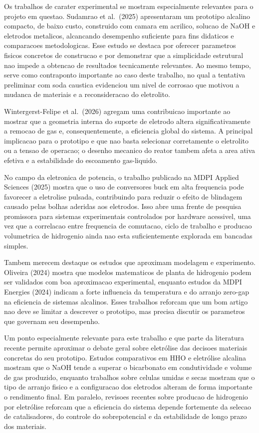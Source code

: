 \documentclass[12pt,oneside,a4paper,english,brazilian]{abntex2}
\begin{document}
Os trabalhos de carater experimental se mostram especialmente relevantes para o projeto em questao. Sudamrao et al.\ (2025) apresentaram um prototipo alcalino compacto, de baixo custo, construido com camara em acrilico, solucao de NaOH e eletrodos metalicos, alcancando desempenho suficiente para fins didaticos e comparacoes metodologicas. Esse estudo se destaca por oferecer parametros fisicos concretos de construcao e por demonstrar que a simplicidade estrutural nao impede a obtencao de resultados tecnicamente relevantes. Ao mesmo tempo, serve como contraponto importante ao caso deste trabalho, no qual a tentativa preliminar com soda caustica evidenciou um nivel de corrosao que motivou a mudanca de materiais e a reconsideracao do eletrolito.

Wintergerst-Felipe et al.\ (2026) agregam uma contribuicao importante ao mostrar que a geometria interna do suporte de eletrodo altera significativamente a remocao de gas e, consequentemente, a eficiencia global do sistema. A principal implicacao para o prototipo e que nao basta selecionar corretamente o eletrolito ou a tensao de operacao; o desenho mecanico do reator tambem afeta a area ativa efetiva e a estabilidade do escoamento gas-liquido.

No campo da eletronica de potencia, o trabalho publicado na MDPI Applied Sciences (2025) mostra que o uso de conversores buck em alta frequencia pode favorecer a eletrolise pulsada, contribuindo para reduzir o efeito de blindagem causado pelas bolhas aderidas aos eletrodos. Isso abre uma frente de pesquisa promissora para sistemas experimentais controlados por hardware acessivel, uma vez que a correlacao entre frequencia de comutacao, ciclo de trabalho e producao volumetrica de hidrogenio ainda nao esta suficientemente explorada em bancadas simples.

Tambem merecem destaque os estudos que aproximam modelagem e experimento. Oliveira (2024) mostra que modelos matematicos de planta de hidrogenio podem ser validados com boa aproximacao experimental, enquanto estudos da MDPI Energies (2024) indicam a forte influencia da temperatura e do arranjo zero-gap na eficiencia de sistemas alcalinos. Esses trabalhos reforcam que um bom artigo nao deve se limitar a descrever o prototipo, mas precisa discutir os parametros que governam seu desempenho.

Um ponto especialmente relevante para este trabalho e que parte da literatura recente permite aproximar o debate geral sobre eletrólise das decisoes materiais concretas do seu prototipo. Estudos comparativos em HHO e eletrólise alcalina mostram que o NaOH tende a superar o bicarbonato em condutividade e volume de gas produzido, enquanto trabalhos sobre celulas umidas e secas mostram que o tipo de arranjo fisico e a configuracao dos eletrodos alteram de forma importante o rendimento final. Em paralelo, revisoes recentes sobre producao de hidrogenio por eletrólise reforcam que a eficiencia do sistema depende fortemente da selecao de catalisadores, do controle do sobrepotencial e da estabilidade de longo prazo dos materiais.
\end{document}
